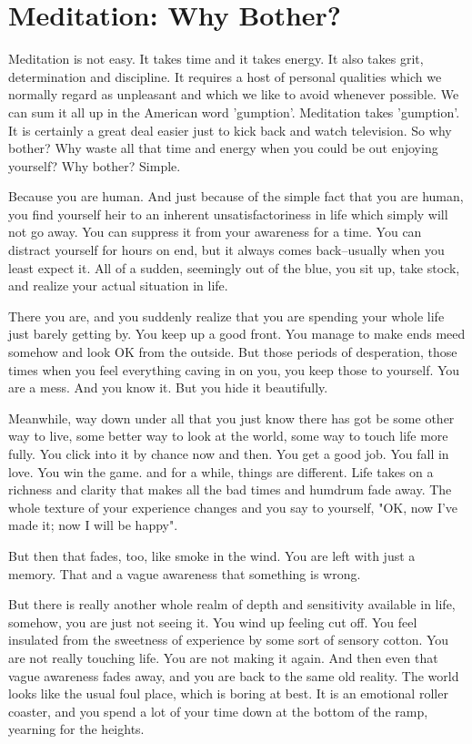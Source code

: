 \chapter{Meditation: Why Bother?}

Meditation is not easy. It takes time and it takes energy. It also takes grit,
determination and discipline. It requires a host of personal qualities which we
normally regard as unpleasant and which we like to avoid whenever possible. We
can sum it all up in the American word 'gumption'. Meditation takes 'gumption'.
It is certainly a great deal easier just to kick back and watch television. So
why bother? Why waste all that time and energy when you could be out enjoying
yourself? Why bother? Simple.

Because you are human. And just because of the simple fact that you are human,
you find yourself heir to an inherent unsatisfactoriness in life which simply
will not go away. You can suppress it from your awareness for a time. You can
distract yourself for hours on end, but it always comes back--usually when you
least expect it. All of a sudden, seemingly out of the blue, you sit up, take
stock, and realize your actual situation in life.

There you are, and you suddenly realize that you are spending your whole life
just barely getting by. You keep up a good front.
You manage to make ends meed somehow and look OK from the outside. But those periods of desperation, those times when you
feel everything caving in on you, you keep those to yourself. You are a mess. And you know it. But you hide it beautifully.

Meanwhile, way down under all that you just know there has got be some other way
to live, some better way to look at the world, some way to touch life more
fully. You click into it by chance now and then. You get a good job. You fall in
love. You win the game. and for a while, things are different. Life takes on a
richness and clarity that makes all the bad times and humdrum fade away. The
whole texture of your experience changes and you say to yourself, "OK, now I've
made it; now I will be happy".

But then that fades, too, like smoke in the wind. You are left with just a
memory. That and a vague awareness that something is wrong.

But there is really another whole realm of depth and sensitivity available in
life, somehow, you are just not seeing it. You wind up feeling cut off. You feel
insulated from the sweetness of experience by some sort of sensory cotton. You
are not really touching life. You are not making it again. And then even that
vague awareness fades away, and you are back to the same old reality. The world
looks like the usual foul place, which is boring at best. It is an emotional
roller coaster, and you spend a lot of your time down at the bottom of the ramp,
yearning for the heights.

